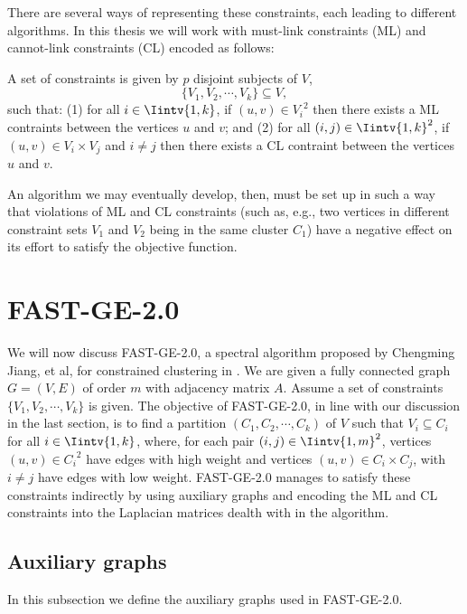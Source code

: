 There are several ways of representing these constraints, each leading to different algorithms. 
In this thesis we will work with must-link constraints (ML) and cannot-link constraints (CL) encoded as follows:

A set of constraints is given by $p$ disjoint subjects of $V$,
\begin{equation}
   \{ V_1, V_2, \cdots, V_k \} \subseteq V,
\end{equation}
such that: (1) for all $i \in \Iintv{1,k}$, if $(u,v) \in {V_i}^2$ then there exists a ML contraints between the vertices $u$ and $v$; and (2) for all $(i,j) \in \Iintv{1,k}^2$, if $(u,v) \in V_i \times V_j$ and $i \ne j$ then there exists a CL contraint between the vertices $u$ and $v$. 

An algorithm we may eventually develop, then, must be set up in such a way that violations of ML and CL constraints (such as, e.g., two vertices in different constraint sets $V_1$ and $V_2$ being in the same cluster $C_1$) have a negative effect on its effort to satisfy the objective function.

\section{FAST-GE-2.0}
We will now discuss FAST-GE-2.0, a spectral algorithm proposed by Chengming Jiang, et al, for constrained clustering in \cite{fastge2}.
We are given a fully connected graph $G = (V,E)$ of order $m$ with adjacency matrix $A$.
Assume a set of constraints $\{V_1, V_2, \cdots, V_k \}$ is given.
The objective of FAST-GE-2.0, in line with our discussion in the last section, is to find a partition $(C_1, C_2, \cdots, C_k)$ of $V$ such that $V_i \subseteq C_i$ for all $i \in \Iintv{1,k}$, where, for each pair $(i,j) \in \Iintv{1,m}^2$, vertices $(u,v) \in {C_i}^2$ have edges with high weight and vertices $(u,v) \in {C_i} \times {C_j}$, with $i \ne j$ have edges with low weight.
FAST-GE-2.0 manages to satisfy these constraints indirectly by using auxiliary graphs and encoding the ML and CL constraints into the Laplacian matrices dealth with in the algorithm.

\subsection{Auxiliary graphs}
In this subsection we define the auxiliary graphs used in FAST-GE-2.0.


